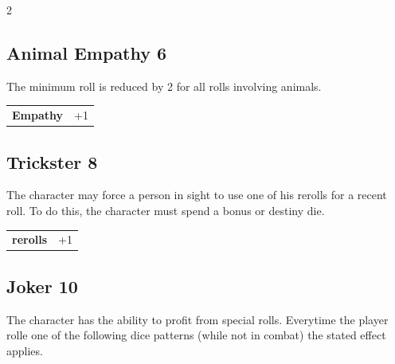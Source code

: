\begin{multicols}{2}
\begin{tcolorbox}

\end{tcolorbox}

\begin{tcolorbox}
    \subsection*{Animal Empathy \hfill \small{6 }}
    \tcblower
The minimum roll is reduced by 2 for all rolls involving animals.


\vspace{3mm}

\begin{tabular}{@{}ll@{}}
    \textbf{Empathy} & +1\\
\end{tabular}


\end{tcolorbox}

\begin{tcolorbox}
    \subsection*{Trickster \hfill \small{8 }}
    \tcblower
The character may force a person in sight to use one of his rerolls for a recent roll. To do this, the character must spend a bonus or destiny die.


\vspace{3mm}

\begin{tabular}{@{}ll@{}}
    \textbf{rerolls} & +1\\
\end{tabular}


\end{tcolorbox}

\begin{tcolorbox}
    \subsection*{Joker \hfill \small{10 }}
    \tcblower
The character has the ability to profit from special rolls. Everytime the player rolle one of the following dice patterns (while not in combat) the stated effect applies.


\end{tcolorbox}
\end{multicols}
